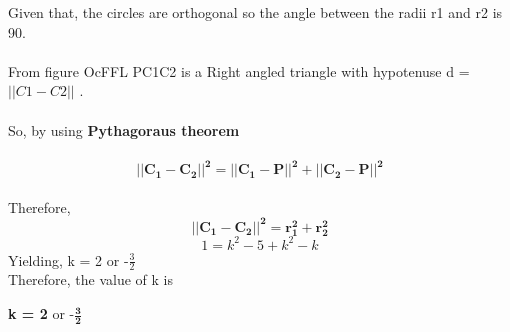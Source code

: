 \documentclass[journal,12pt,twocolumn]{IEEEtran}
\let\vec\mathbf
\newlength\triwidth
\newcommand\tridelt[1]{%
  \setlength\triwidth{\widthof{#1\ }}%
  \stackengine{-.1\triwidth}{#1\ }%
    {\scaleto{\Delta}{1\triwidth}}{O}{c}{F}{F}{L}%
}
\begin{document}
Given that, the circles are orthogonal so the angle between the radii r1 and r2 is 90\textdegree.  \\
\\
From figure \tridelt.PC1C2 is a Right angled triangle with hypotenuse d = $||C1-C2||$ .  \\
\\
So, by using \textbf{Pythagoraus theorem}  \\
\\
\begin{equation}
    \vec{||C_1 - C_2||^2 = ||C_1 - P||^2+||C_2 - P||^2}
\end{equation}
\\
Therefore,$$\vec{||C_1 - C_2||^2 = r_1^2+r_2^2}$$
\begin{equation}
    1 = k^2 -5 + k^2 - k
\end{equation}
Yielding, k = 2 or -$\frac{3}{2}$ \\
Therefore, the value of k is \\
\begin{center}
    \textbf{k = 2} or -$\boldsymbol{\frac{3}{2}}$\\
\end{center}
\end{document}
